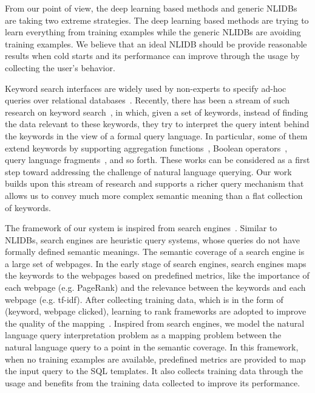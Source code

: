 \documentclass{vldb}
\begin{document}
From our point of view, the deep learning based methods and generic NLIDBs are taking two extreme strategies.  The deep learning based methods are trying to learn everything from training examples while the generic NLIDBs are avoiding training examples.  We believe that an ideal NLIDB should be provide reasonable results when cold starts and its performance can improve through the usage by collecting the user's behavior.  

Keyword search interfaces are widely used by non-experts to specify ad-hoc queries over relational databases~\cite{DBLP:series/synthesis/2010Yu,DBLP:conf/icde/BhalotiaHNCS02,DBLP:conf/icde/AgrawalCD02,DBLP:conf/vldb/HristidisP02}. Recently, there has been a stream of such research on keyword search~\cite{DBLP:conf/sigmod/TataL08,DBLP:journals/vldb/SimitsisKI08,DBLP:conf/sigmod/ChuBCDN09,DBLP:journals/pvldb/XinHG10,DBLP:conf/icde/FanLZ11,DBLP:journals/pvldb/BlunschiJKMS12,DBLP:journals/pvldb/BergamaschiGILV13}, in which, given a set of keywords, instead of finding the data relevant to these keywords, they try to interpret the query intent behind the keywords in the view of a formal query language. In particular, some of them extend keywords by supporting aggregation functions~\cite{DBLP:conf/sigmod/TataL08}, Boolean operators~\cite{DBLP:journals/vldb/SimitsisKI08}, query language fragments~\cite{DBLP:journals/pvldb/BlunschiJKMS12}, and so forth. These works can be considered as a first step toward addressing the challenge of natural language querying. Our work builds upon this stream of research and supports a richer query mechanism that allows us to convey much more complex semantic meaning than a flat collection of keywords.

The framework of our system is inspired from search engines~\cite{DBLP:journals/cn/BrinP98,Page99thepagerank}.  Similar to NLIDBs, search engines are heuristic query systems, whose queries do not have formally defined semantic meanings. The semantic coverage of a search engine is a large set of webpages.  In the early stage of search engines, search engines maps the keywords to the webpages based on predefined metrics, like the importance of each webpage (e.g. PageRank) and the relevance between the keywords and each webpage (e.g. tf-idf).  After collecting training data, which is in the form of (keyword, webpage clicked), learning to rank frameworks are adopted to improve the quality of the mapping~\cite{DBLP:books/daglib/0027504}.  Inspired from search engines, we model the natural language query interpretation problem as a mapping problem between the natural language query to a point in the semantic coverage.  In this framework, when no training examples are available, predefined metrics are provided to map the input query to the SQL templates.  It also collects training data through the usage and benefits from the training data collected to improve its performance.
\end{document}
